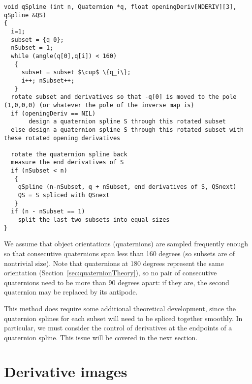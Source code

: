 \documentclass[11pt]{article}
\begin{document}
\begin{verbatim}
void qSpline (int n, Quaternion *q, float openingDeriv[NDERIV][3], qSpline &QS)
{
  i=1;
  subset = {q_0};
  nSubset = 1;
  while (angle(q[0],q[i]) < 160)
   {
     subset = subset $\cup$ \{q_i\};
     i++; nSubset++;
   }
  rotate subset and derivatives so that -q[0] is moved to the pole (1,0,0,0) (or whatever the pole of the inverse map is)
  if (openingDeriv == NIL)
       design a quaternion spline S through this rotated subset
  else design a quaternion spline S through this rotated subset with these rotated opening derivatives
  
  rotate the quaternion spline back
  measure the end derivatives of S
  if (nSubset < n)
   {
    qSpline (n-nSubset, q + nSubset, end derivatives of S, QSnext)
    QS = S spliced with QSnext
   }
  if (n - nSubset == 1)
    split the last two subsets into equal sizes
}
\end{verbatim}

We assume that object orientations (quaternions) are sampled frequently enough
so that consecutive quaternions span less than 160 degrees
(so subsets are of nontrivial size).
Note that quaternions at 180 degrees represent the same orientation (Section~\ref{sec:quaternionTheory}),
so no pair of consecutive quaternions need to be more than 90 degrees apart:
if they are, the second quaternion may be replaced by its antipode.

This method does require some additional theoretical development,
since the quaternion splines for each subset will need to be spliced 
together smoothly.
In particular, we must consider the control of derivatives at the endpoints of a
quaternion spline.
This issue will be covered in the next section.

\clearpage

\section{Derivative images}
\label{sec:deriv}
\end{document}
